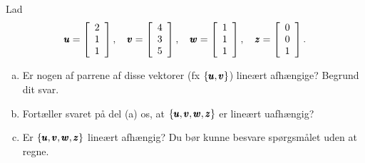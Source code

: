 \begin{example} Lad
    \[
    \pmb{u} = \left[\begin{array}{l}
    2 \\
    1 \\
    1
    \end{array}\right], \quad \pmb{v} = \left[\begin{array}{l}
    4 \\
    3 \\
    5
    \end{array}\right], \quad \pmb{w} = \left[\begin{array}{l}
    1 \\
    1 \\
    1
    \end{array}\right], \quad \pmb{z} = \left[\begin{array}{l}
    0 \\
    0 \\
    1
    \end{array}\right].
    \]

    \begin{enumerate}[(a)]
        \item Er nogen af parrene af disse vektorer (fx $\{\pmb{u}, \pmb{v}\}$) lineært afhængige? Begrund dit svar.
        \item Fortæller svaret på del (a) os, at $\{\pmb{u}, \pmb{v}, \pmb{w}, \pmb{z}\}$ er lineært uafhængig?
        \item Er $\{\pmb{u}, \pmb{v}, \pmb{w}, \pmb{z}\}$ lineært afhængig? Du bør kunne besvare spørgsmålet uden at regne.
    \end{enumerate}
\end{example}

